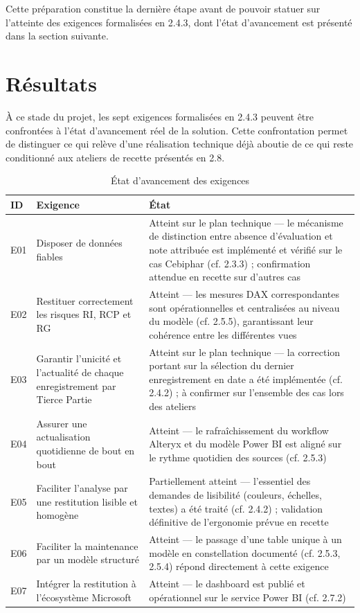 Cette préparation constitue la dernière étape avant de pouvoir statuer sur l'atteinte des 
exigences formalisées en 2.4.3, dont l'état d'avancement est présenté dans la section 
suivante. 

\section{Résultats}

À ce stade du projet, les sept exigences formalisées en 2.4.3 peuvent être confrontées à l'état 
d'avancement réel de la solution. Cette confrontation permet de distinguer ce qui relève d'une 
réalisation technique déjà aboutie de ce qui reste conditionné aux ateliers de recette présentés 
en 2.8.

\begin{table}[htbp]
\centering
\renewcommand{\arraystretch}{1.5}
\begin{tabularx}{\textwidth}{| l | p{5cm} | X |}
\hline
\textbf{ID} & \textbf{Exigence} & \textbf{État} \\
\hline
E01 & Disposer de données fiables & Atteint sur le plan technique --- le mécanisme de distinction entre absence d'évaluation et note attribuée est implémenté et vérifié sur le cas Cebiphar (cf. 2.3.3) ; confirmation attendue en recette sur d'autres cas \\
\hline
E02 & Restituer correctement les risques RI, RCP et RG & Atteint --- les mesures DAX correspondantes sont opérationnelles et centralisées au niveau du modèle (cf. 2.5.5), garantissant leur cohérence entre les différentes vues \\
\hline
E03 & Garantir l'unicité et l'actualité de chaque enregistrement par Tierce Partie & Atteint sur le plan technique --- la correction portant sur la sélection du dernier enregistrement en date a été implémentée (cf. 2.4.2) ; à confirmer sur l'ensemble des cas lors des ateliers \\
\hline
E04 & Assurer une actualisation quotidienne de bout en bout & Atteint --- le rafraîchissement du workflow Alteryx et du modèle Power BI est aligné sur le rythme quotidien des sources (cf. 2.5.3) \\
\hline
E05 & Faciliter l'analyse par une restitution lisible et homogène & Partiellement atteint --- l'essentiel des demandes de lisibilité (couleurs, échelles, textes) a été traité (cf. 2.4.2) ; validation définitive de l'ergonomie prévue en recette \\
\hline
E06 & Faciliter la maintenance par un modèle structuré & Atteint --- le passage d'une table unique à un modèle en constellation documenté (cf. 2.5.3, 2.5.4) répond directement à cette exigence \\
\hline
E07 & Intégrer la restitution à l'écosystème Microsoft & Atteint --- le dashboard est publié et opérationnel sur le service Power BI (cf. 2.7.2) \\
\hline
\end{tabularx}
\caption{État d'avancement des exigences}
\end{table}

